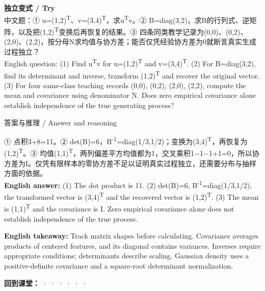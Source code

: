 \textbf{独立变式 / Try}\\

中文题：① u=(1,2)\textsuperscript{T}、v=(3,4)\textsuperscript{T}，求u\textsuperscript{T}v。② B=diag(3,2)，求B的行列式、逆矩阵，以及把(1,2)\textsuperscript{T}变换后再恢复的结果。③ 四条同类教学记录为(0,0)、(0,2)、(2,0)、(2,2)，按分母N求均值与协方差；能否仅凭经验协方差为0就断言真实生成过程独立？\\

English question: (1) Find u\textsuperscript{T}v for u=(1,2)\textsuperscript{T} and v=(3,4)\textsuperscript{T}. (2) For B=diag(3,2), find its determinant and inverse, transform (1,2)\textsuperscript{T} and recover the original vector. (3) For four same-class teaching records (0,0), (0,2), (2,0), (2,2), compute the mean and covariance using denominator N. Does zero empirical covariance alone establish independence of the true generating process?



\begin{StudySolution}{答案与推理 / Answer and reasoning}


① 点积3+8=11。② det(B)=6，B\textsuperscript{-}\textsuperscript{1}=diag(1/3,1/2)；变换为(3,4)\textsuperscript{T}，再恢复为(1,2)\textsuperscript{T}。③ 均值(1,1)\textsuperscript{T}，两列偏差平方均值都为1，交叉乘积1\ensuremath{-}1\ensuremath{-}1+1=0，所以协方差为I。仅凭有限样本的零协方差不足以证明真实过程独立，还需要分布与抽样方面的依据。\\

\textbf{English answer:} (1) The dot product is 11. (2) det(B)=6, B\textsuperscript{-}\textsuperscript{1}=diag(1/3,1/2), the transformed vector is (3,4)\textsuperscript{T} and the recovered vector is (1,2)\textsuperscript{T}. (3) The mean is (1,1)\textsuperscript{T} and the covariance is I. Zero empirical covariance alone does not establish independence of the true process.


\end{StudySolution}


\textbf{English takeaway:} Track matrix shapes before calculating. Covariance averages products of centered features, and its diagonal contains variances. Inverses require appropriate conditions; determinants describe scaling. Gaussian density uses a positive-definite covariance and a square-root determinant normalization.


\textbf{回到课堂：}  ·  ·  ·  ·  ·  · 






